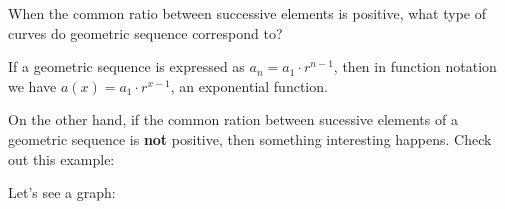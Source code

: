 \documentclass{ximera}
\begin{document}
\begin{question}
  When the common ratio between successive elements is positive, what
  type of curves do geometric sequence correspond to?
  \begin{multipleChoice}
  \end{multipleChoice}
  \begin{feedback}
  If a geometric sequence is expressed as $a_n = a_1 \cdot r^{n-1}$,
  then in function notation we have $a(x) = a_1 \cdot r^{x-1}$, an
  exponential function.
  \end{feedback}
\end{question}



On the other hand, if the common ration between sucessive elements of
a geometric sequence is \textbf{not} positive, then something
interesting happens. Check out this example:
\begin{image}
\end{image}
Let's see a graph:
\end{document}

